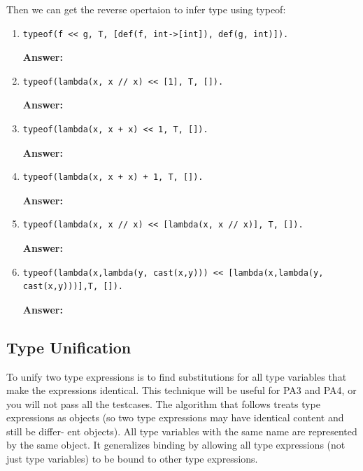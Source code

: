 \documentclass[a4paper]{exam}
\theoremstyle{definition}
\begin{document}
Then we can get the reverse opertaion to infer type using typeof:
\begin{enumerate}
  \item \begin{verbatim}
typeof(f << g, T, [def(f, int->[int]), def(g, int)]).
  \end{verbatim}

        \textbf{Answer:}
  \item \begin{verbatim}
typeof(lambda(x, x // x) << [1], T, []).
  \end{verbatim}

        \textbf{Answer:}
  \item \begin{verbatim}
typeof(lambda(x, x + x) << 1, T, []).
  \end{verbatim}

        \textbf{Answer:}
  \item \begin{verbatim}
typeof(lambda(x, x + x) + 1, T, []).
  \end{verbatim}

        \textbf{Answer:}
  \item \begin{verbatim}
typeof(lambda(x, x // x) << [lambda(x, x // x)], T, []).
  \end{verbatim}

        \textbf{Answer:}
  \item \begin{verbatim}
typeof(lambda(x,lambda(y, cast(x,y))) << [lambda(x,lambda(y, cast(x,y)))],T, []).
  \end{verbatim}

        \textbf{Answer:}

\end{enumerate}


\subsection{Type Unification}
To unify two type expressions is to find substitutions for all type variables that make the expressions identical. This technique will be useful for PA3 and PA4, or you will not pass all the testcases. The algorithm that follows treats type expressions as objects (so two type expressions may have identical content and still be differ- ent objects). All type variables with the same name are represented by the same object. It generalizes binding by allowing all type expressions (not just type variables) to be bound to other type expressions.
\end{document}

